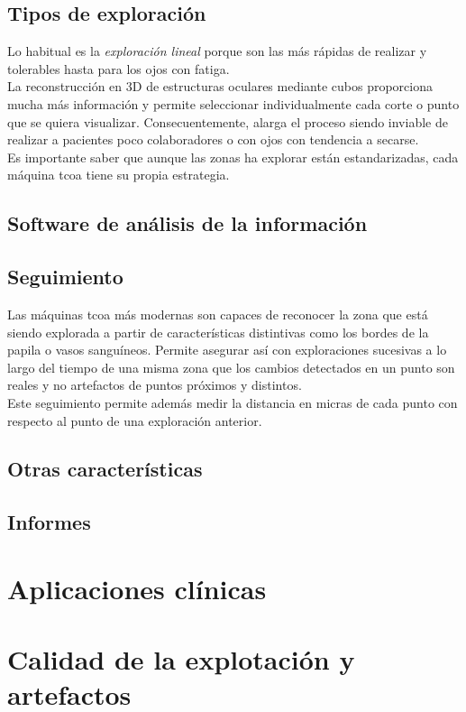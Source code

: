 \subsection{Tipos de exploración}
Lo habitual es la \emph{exploración lineal} porque son las más rápidas
de realizar y tolerables hasta para los ojos con
fatiga.\\
La reconstrucción en 3D de estructuras oculares mediante cubos
proporciona mucha más información y permite seleccionar
individualmente cada corte o punto que se quiera
visualizar. Consecuentemente, alarga el proceso siendo inviable de
realizar a pacientes poco colaboradores o con ojos con tendencia a
secarse.\\
Es importante saber que aunque las zonas ha explorar están estandarizadas, cada máquina
\gls{tcoa} tiene su propia estrategia.

\subsection{Software de análisis de la información}

\subsection{Seguimiento}
Las máquinas \gls{tcoa} más modernas son capaces de reconocer la zona
que está siendo explorada a partir de características distintivas como
los bordes de la papila o vasos sanguíneos. Permite asegurar así con
exploraciones sucesivas a lo largo del tiempo de una misma zona que
los cambios detectados en un punto son reales y no artefactos de
puntos próximos y distintos.\\
Este seguimiento permite además medir la distancia en micras de cada
punto con respecto al punto de una exploración anterior.

\subsection{Otras características}

\subsection{Informes}

\section{Aplicaciones clínicas}

\section{Calidad de la explotación y artefactos}
